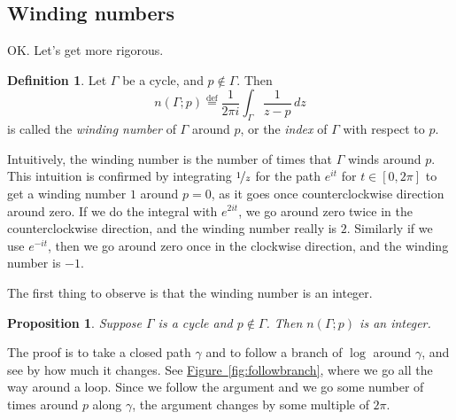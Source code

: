 \documentclass[12pt,openany]{book}
\newcommand{\avoidbreak}{\postdisplaypenalty=100}
\newcommand{\myindex}[1]{#1\index{#1}}
\theoremstyle{plain}
\newtheorem{prop}[thm]{Proposition}
\theoremstyle{remark}
\theoremstyle{definition}
\newtheorem{defn}[thm]{Definition}
\theoremstyle{exercise}
\theoremstyle{example}
\newcommand{\figureref}[1]{\hyperref[#1]{Figure~\ref*{#1}}}
\begin{document}
\subsection{Winding numbers}

OK.  Let's get more rigorous.

\begin{defn}\label{defn:windingnumber}
Let $\Gamma$ be
a cycle,
and $p \notin \Gamma$.  Then
%
\begin{equation*}
n(\Gamma;p)
\overset{\text{def}}{=}
\frac{1}{2\pi i} \int_\Gamma \frac{1}{z-p} \, dz
\end{equation*}
is called the
\emph{\myindex{winding number}} of $\Gamma$ around $p$, or
the 
\emph{\myindex{index}} of $\Gamma$ with respect to $p$.
\end{defn}

Intuitively, the winding number is the number of times that $\Gamma$ winds
around $p$.  This intuition is confirmed by integrating
$\nicefrac{1}{z}$ for the path $e^{it}$ for $t \in [0,2\pi]$ to get
a winding number $1$ around $p=0$,
as it goes once counterclockwise direction around zero.  If we do
the integral with $e^{2it}$, we go around zero twice in the
counterclockwise direction, and the winding number really is $2$.  Similarly
if we use $e^{-it}$, then we go around zero once in the
clockwise direction, and the winding number is $-1$.

The first thing to observe is that the winding number is an integer.

\begin{prop} \label{prop:indexinteger}
Suppose $\Gamma$ is a cycle and $p \notin \Gamma$.  Then
$n(\Gamma;p)$ is an integer.
\end{prop}

The proof is to take a closed path $\gamma$
and to follow a branch of $\log$ around $\gamma$, and
see by how much it changes.  See \figureref{fig:followbranch}, where we
go all the way around a loop.  Since we follow the argument
and we go some number of times around $p$ along $\gamma$, the
argument changes by some multiple of $2\pi$.
\end{document}

